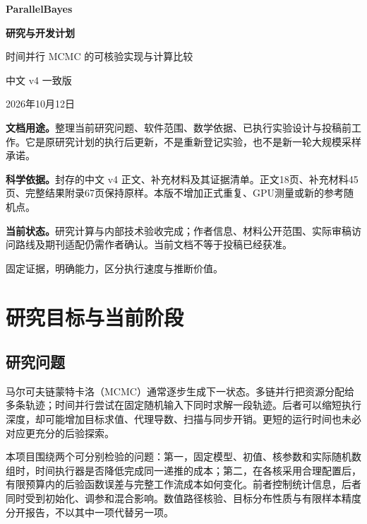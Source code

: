 \documentclass[UTF8,zihao=-4,a4paper,fontset=fandol]{ctexart}
\begin{document}
\begin{titlepage}\centering
\vspace*{18mm}
{\LARGE\bfseries ParallelBayes\par}
\vspace{10mm}
{\huge\bfseries 研究与开发计划\par}
\vspace{5mm}
{\Large 时间并行 MCMC 的可核验实现与计算比较\par}
\vspace{12mm}
{\large 中文 v4 一致版\par}
{\large 2026年10月12日\par}
\vspace{16mm}
\begin{minipage}{.87\linewidth}
\textbf{文档用途。}整理当前研究问题、软件范围、数学依据、已执行实验设计与投稿前工作。它是原研究计划的执行后更新，不是重新登记实验，也不是新一轮大规模采样承诺。

\textbf{科学依据。}封存的中文 v4 正文、补充材料及其证据清单。正文18页、补充材料45页、完整结果附录67页保持原样。本版不增加正式重复、GPU测量或新的参考随机点。

\textbf{当前状态。}研究计算与内部技术验收完成；作者信息、材料公开范围、实际审稿访问路线及期刊适配仍需作者确认。当前文档不等于投稿已经获准。
\end{minipage}
\vfill
{\small 固定证据，明确能力，区分执行速度与推断价值。\par}
\end{titlepage}
\tableofcontents\clearpage


\section{研究目标与当前阶段}
\subsection{研究问题}
马尔可夫链蒙特卡洛（MCMC）通常逐步生成下一状态。多链并行把资源分配给多条轨迹；时间并行尝试在固定随机输入下同时求解一段轨迹。后者可以缩短执行深度，却可能增加目标求值、代理导数、扫描与同步开销。更短的运行时间也未必对应更充分的后验探索。

本项目围绕两个可分别检验的问题：第一，固定模型、初值、核参数和实际随机数组时，时间执行器是否降低完成同一递推的成本；第二，在各核采用合理配置后，有限预算内的后验函数误差与完整工作流成本如何变化。前者控制统计信息，后者同时受到初始化、调参和混合影响。数值路径核验、目标分布性质与有限样本精度分开报告，不以其中一项代替另一项。
\end{document}
